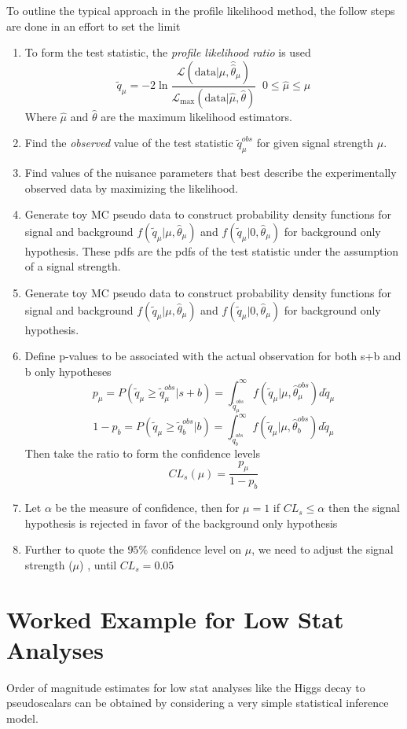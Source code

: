 To outline the typical approach in the profile likelihood method, the follow steps are done in an effort to set the limit
\begin{enumerate}
\item {To form the test statistic, the \textit{profile likelihood ratio} is used 
  \[\tilde{q}_\mu = -2 \ln \frac{\mathcal{L}(\text{data}|\mu,\hat{\hat{\theta}}_\mu)}{\mathcal{L}_\text{max}(\text{data}|\hat{\mu},\hat{\theta})} \;\; 0\leq \hat{\mu} \leq \mu \]
  Where $\hat{\mu}$ and $\hat{\theta}$ are the maximum likelihood estimators. 
  }
  \item Find the \textit{observed} value of the test statistic $\tilde{q}_\mu^{obs}$ for given signal strength $\mu$.
  \item Find values of the nuisance parameters that best describe the experimentally observed data by maximizing the likelihood.
  \item Generate toy MC pseudo data to construct probability density functions for signal and background $f(\tilde{q}_\mu|\mu,\hat{\theta}_\mu)$ and $f(\tilde{q}_\mu|0,\hat{\theta}_\mu)$ for background only hypothesis. These pdfs are the pdfs of the test statistic under the assumption of a signal strength.
  \item Generate toy MC pseudo data to construct probability density functions for signal and background $f(\tilde{q}_\mu|\mu,\hat{\theta}_\mu)$ and $f(\tilde{q}_\mu|0,\hat{\theta}_\mu)$ for background only hypothesis.
  \item {Define p-values to be associated with the actual observation for both s+b and b only hypotheses
  \[ p_\mu = P(\tilde{q}_\mu \ge \tilde{q}_\mu^{obs}| s+b) = \int_{\tilde{q}_\mu^{obs}}^\infty f(\tilde{q}_\mu |\mu,\hat{\theta}_\mu^{obs} ) d\tilde{q}_\mu\]
  \[ 1- p_b = P(\tilde{q}_\mu \ge \tilde{q}_b^{obs}| b) = \int_{\tilde{q}_b^{obs}}^\infty f(\tilde{q}_\mu |\mu,\hat{\theta}_b^{obs} ) d\tilde{q}_\mu\]
   Then take the ratio to form the confidence levels
  \[ CL_s (\mu)  = \frac{p_\mu}{1-p_b}\]
  }
  \item{ Let $\alpha$ be the measure of confidence, then for $\mu=1$ if $CL_s \leq \alpha$ then the signal hypothesis is rejected in favor of the background only hypothesis}
  \item {Further to quote the $95\%$ confidence level on $\mu$, we need to adjust the signal strength ($\mu$) , until $CL_s = 0.05$}
\end{enumerate}


\section{Worked Example for Low Stat Analyses}
Order of magnitude estimates for low stat analyses like the Higgs decay to pseudoscalars can be obtained by considering a very simple statistical inference model. 

